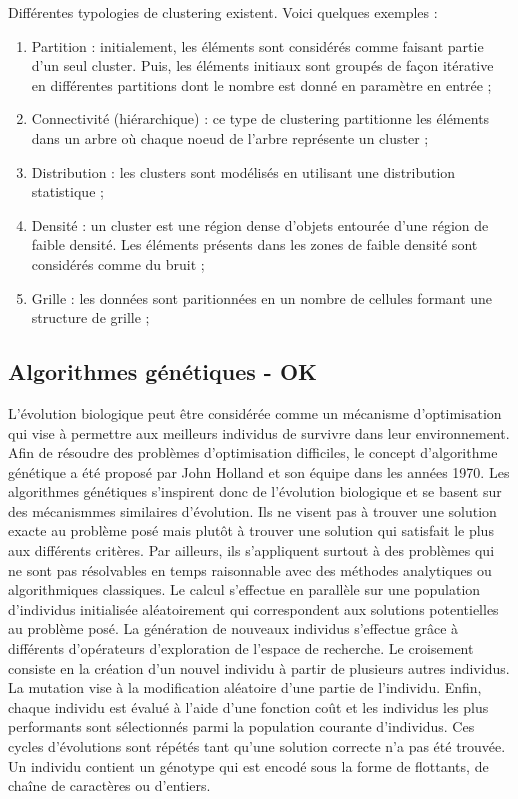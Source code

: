 \documentclass[draft]{llncs}
\begin{document}
Différentes typologies de clustering existent. Voici quelques exemples : 

\begin{enumerate}
  \item Partition : initialement, les éléments sont considérés comme faisant partie d'un seul cluster. Puis, les éléments initiaux sont groupés de façon itérative en différentes partitions dont le nombre est donné en paramètre en entrée ;
  \item Connectivité (hiérarchique) : ce type de clustering partitionne les éléments dans un arbre où chaque noeud de l'arbre représente un cluster ;
  \item Distribution : les clusters sont modélisés en utilisant une distribution statistique ;
  \item Densité : un cluster est une région dense d'objets entourée d'une région de faible densité. Les éléments présents dans les zones de faible densité sont considérés comme du bruit ;
  \item Grille : les données sont paritionnées en un nombre de cellules formant une structure de grille ;
\end{enumerate}



\subsection{Algorithmes génétiques - OK}
 
L'évolution biologique peut être considérée comme un mécanisme d'optimisation qui vise à permettre aux meilleurs individus de survivre dans leur environnement.
Afin de résoudre des problèmes d'optimisation difficiles, le concept d'algorithme génétique a été proposé par John Holland et son équipe \cite{Holland:1975} dans les années 1970. 
Les algorithmes génétiques s'inspirent donc de l'évolution biologique et se basent sur des mécanismmes similaires d'évolution.
Ils ne visent pas à trouver une solution exacte au problème posé mais plutôt à trouver une solution qui satisfait le plus aux différents critères.
Par ailleurs, ils s'appliquent surtout à des problèmes qui ne sont pas résolvables en temps raisonnable avec des méthodes analytiques ou algorithmiques classiques.
Le calcul s'effectue en parallèle sur une population d’individus initialisée aléatoirement qui correspondent aux solutions potentielles au problème posé. 
La génération de nouveaux individus s'effectue grâce à différents d’opérateurs d’exploration de l'espace de recherche. 
Le croisement consiste en la création d’un nouvel individu à partir de plusieurs autres individus. 
La mutation vise à la modification aléatoire d’une partie de l’individu. 
Enfin, chaque individu est évalué à l'aide d'une fonction coût et les individus les plus performants sont sélectionnés parmi la population courante d'individus.
Ces cycles d'évolutions sont répétés tant qu'une solution correcte n'a pas été trouvée.
Un individu contient un génotype qui est encodé sous la forme de flottants, de chaîne de caractères ou d'entiers.
\end{document}
